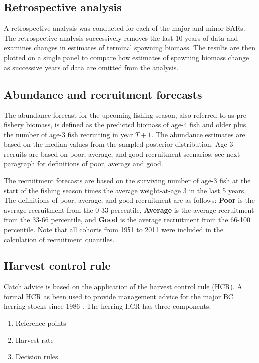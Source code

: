 	\subsection{Retrospective analysis}
	A retrospective analysis was conducted for each of the major and minor SARs.  The retrospective analysis successively removes the last 10-years of data and examines changes in estimates of terminal spawning biomass.  The results are then plotted on a single panel to compare how estimates of spawning biomass change as successive years of data are omitted from the analysis.
	
	\subsection{Abundance and recruitment forecasts}
	The abundance forecast for the upcoming fishing season, also referred to as pre-fishery biomass, is defined as the predicted biomass of age-4 fish and older plus the number of age-3 fish recruiting in year $T+1$.  The abundance estimates are based on the median values from the sampled posterior distribution.  Age-3 recruits are based on poor, average, and good recruitment scenarios; see next paragraph for definitions of poor, average and good.
	
	The recruitment forecasts are based on the surviving number of age-3 fish at the start of the fishing season times the average weight-at-age 3 in the last 5 years. The definitions of poor, average, and good recruitment are as follows: \textbf{Poor} is the average recruitment from the 0-33 percentile, \textbf{Average} is the average recruitment from the 33-66 percentile, and \textbf{Good} is the average recruitment from the 66-100 percentile.  Note that all cohorts from 1951 to 2011  were included in the calculation of recruitment quantiles.
	
	\subsection{Harvest control rule}
Catch advice is based on the application of the harvest control rule (HCR). A formal HCR as been used to provide management advice for the major BC herring stocks since 1986 \citep{stocker1993recent}. The herring HCR has three components:
\begin{enumerate}
\item Reference points
\item Harvest rate
\item Decision rules
\end{enumerate}

